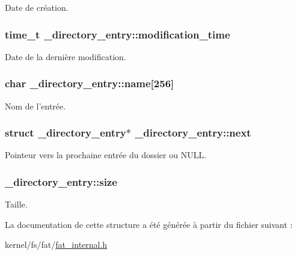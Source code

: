 \-Date de création. \hypertarget{struct__directory__entry_a120c3a3857bd7892a0fc2e6644e6f188}{
\subsubsection[{modification\-\_\-time}]{\setlength{\rightskip}{0pt plus 5cm}time\-\_\-t {\bf \-\_\-directory\-\_\-entry\-::modification\-\_\-time}}}\label{struct__directory__entry_a120c3a3857bd7892a0fc2e6644e6f188}
\-Date de la dernière modification. \hypertarget{struct__directory__entry_ac9142fdeb8e265f045fee1edf9608c78}{
\subsubsection[{name}]{\setlength{\rightskip}{0pt plus 5cm}char {\bf \-\_\-directory\-\_\-entry\-::name}\mbox{[}256\mbox{]}}}\label{struct__directory__entry_ac9142fdeb8e265f045fee1edf9608c78}
\-Nom de l'entrée. \hypertarget{struct__directory__entry_a75001bda0d1d80e4ff5350ad69f83030}{
\subsubsection[{next}]{\setlength{\rightskip}{0pt plus 5cm}struct {\bf \-\_\-directory\-\_\-entry}$\ast$ {\bf \-\_\-directory\-\_\-entry\-::next}}}\label{struct__directory__entry_a75001bda0d1d80e4ff5350ad69f83030}
\-Pointeur vers la prochaine entrée du dossier ou \-N\-U\-L\-L. \hypertarget{struct__directory__entry_a5d6f559c1b7ab2b5a64643073172cc25}{
\subsubsection[{size}]{ {\bf \-\_\-directory\-\_\-entry\-::size}}}\label{struct__directory__entry_a5d6f559c1b7ab2b5a64643073172cc25}
\-Taille. 

\-La documentation de cette structure a été générée à partir du fichier suivant \-:\begin{DoxyCompactItemize}
\item 
kernel/fs/fat/\hyperlink{fat__internal_8h}{fat\-\_\-internal.\-h}\end{DoxyCompactItemize}
